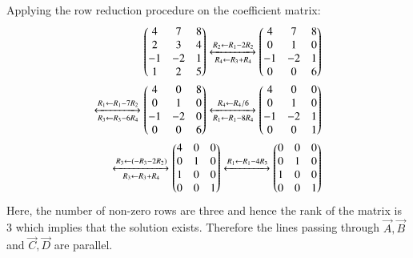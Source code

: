 \documentclass[journal,12pt,twocolumn]{IEEEtran}
\begin{document}
Applying the row reduction procedure on the coefficient matrix:
\begin{align*}
	\begin{pmatrix}4 & 7 & 8\\ 2 & 3 & 4\\ -1 & -2 & 1\\ 1 & 2 & 5\end{pmatrix}
	\xleftrightarrow[R_4 \leftarrow R_3 + R_4]{R_2 \leftarrow R_1 - 2R_2}
	\begin{pmatrix}4 & 7 & 8\\ 0 & 1 & 0\\ -1 & -2 & 1\\ 0 & 0 & 6\end{pmatrix}\\
	\xleftrightarrow[R_3 \leftarrow R_3 - 6R_4]{R_1 \leftarrow R_1 - 7R_2}
	\begin{pmatrix}4 & 0 & 8\\ 0 & 1 & 0\\ -1 & -2 & 0\\ 0 & 0 & 6\end{pmatrix}
	\xleftrightarrow[R_1 \leftarrow R_1 - 8R_4]{R_4 \leftarrow R_4/6}
	\begin{pmatrix}4 & 0 & 0\\ 0 & 1 & 0\\ -1 & -2 & 1\\ 0 & 0 & 1 \end{pmatrix} \\
    \xleftrightarrow[R_3 \leftarrow R_3 + R_4]{R_3 \leftarrow (-R_3 - 2R_2)}
	\begin{pmatrix}4 & 0 & 0\\ 0 & 1 & 0\\ 1 & 0 & 0\\ 0 & 0 & 1\end{pmatrix}
	\xleftrightarrow{R_1 \leftarrow R_1 - 4R_3}
	\begin{pmatrix}0 & 0 & 0\\ 0 & 1 & 0\\ 1 & 0 & 0\\ 0 & 0 & 1\end{pmatrix}
\end{align*}
Here, the number of non-zero rows are three and hence the rank of the matrix is 3 which implies that the solution exists. Therefore the lines passing through $\vec{A}, \vec{B}$ and $\vec{C}, \vec{D}$ are parallel.
\end{document}
